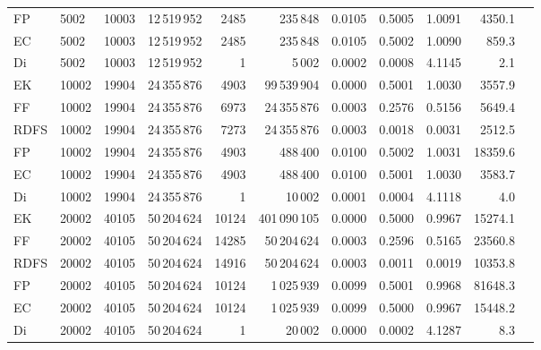 \documentclass{infufrgs}
\begin{document}
\begin{table}[H]
{\begin{tabular}{llrrrrrrrrr}
FP   & 5002  & 10003 & 12\,519\,952 &   2485 & 235\,848       & 0.0105 & 0.5005 & 1.0091 &  4350.1 \\
EC   & 5002  & 10003 & 12\,519\,952 &   2485 & 235\,848       & 0.0105 & 0.5002 & 1.0090 &   859.3 \\
Di   & 5002  & 10003 & 12\,519\,952 &      1 & 5\,002         & 0.0002 & 0.0008 & 4.1145 &     2.1 \\
\midrule
EK   & 10002 & 19904 & 24\,355\,876 &   4903 & 99\,539\,904  & 0.0000 & 0.5001 & 1.0030 &  3557.9 \\
FF   & 10002 & 19904 & 24\,355\,876 &   6973 & 24\,355\,876  & 0.0003 & 0.2576 & 0.5156 &  5649.4 \\
RDFS & 10002 & 19904 & 24\,355\,876 &   7273 & 24\,355\,876  & 0.0003 & 0.0018 & 0.0031 &  2512.5 \\
FP   & 10002 & 19904 & 24\,355\,876 &   4903 & 488\,400       & 0.0100 & 0.5002 & 1.0031 & 18359.6 \\
EC   & 10002 & 19904 & 24\,355\,876 &   4903 & 488\,400       & 0.0100 & 0.5001 & 1.0030 &  3583.7 \\
Di   & 10002 & 19904 & 24\,355\,876 &      1 & 10\,002        & 0.0001 & 0.0004 & 4.1118 &     4.0 \\
\midrule
EK   & 20002 & 40105 & 50\,204\,624 &  10124 & 401\,090\,105 & 0.0000 & 0.5000 & 0.9967 & 15274.1 \\
FF   & 20002 & 40105 & 50\,204\,624 &  14285 & 50\,204\,624  & 0.0003 & 0.2596 & 0.5165 & 23560.8 \\
RDFS & 20002 & 40105 & 50\,204\,624 &  14916 & 50\,204\,624  & 0.0003 & 0.0011 & 0.0019 & 10353.8 \\
FP   & 20002 & 40105 & 50\,204\,624 &  10124 & 1\,025\,939   & 0.0099 & 0.5001 & 0.9968 & 81648.3 \\
EC   & 20002 & 40105 & 50\,204\,624 &  10124 & 1\,025\,939   & 0.0099 & 0.5000 & 0.9967 & 15448.2 \\
Di   & 20002 & 40105 & 50\,204\,624 &      1 & 20\,002        & 0.0000 & 0.0002 & 4.1287 &     8.3 \\
\bottomrule
\end{tabular}}
\end{table}
\end{document}
